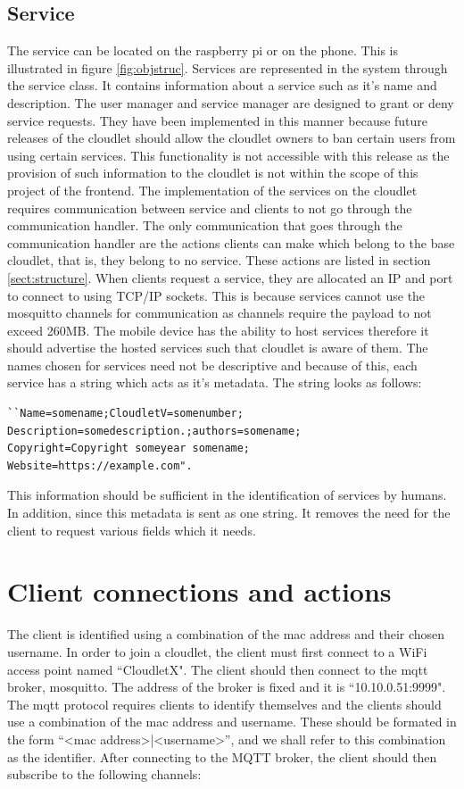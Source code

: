 \subsection{Service}
The service can be located on the raspberry pi or on the phone. This is illustrated in figure \ref{fig:objstruc}. Services are represented in the system through the service class. It contains information about a service such as it's name and description. The user manager and service manager are designed to grant or deny service requests. They have been implemented in this manner because future releases of the cloudlet should allow the cloudlet owners to ban certain users from using certain services. This functionality is not accessible with this release as the provision of such information to the cloudlet is not within the scope of this project of the frontend. The implementation of the services on the cloudlet requires communication between service and clients to not go through the communication handler. The only communication that goes through the communication handler are the actions clients can make which belong to the base cloudlet, that is, they belong to no service. These actions are listed in section \ref{sect:structure}. When clients request a service, they are allocated an IP and port to connect to using TCP/IP sockets. This is because services cannot use the mosquitto channels for communication as channels require the payload to not exceed 260MB. The mobile device has the ability to host services therefore it should advertise the hosted services such that cloudlet is aware of them. The names chosen for services need not be descriptive and because of this, each service has a string which acts as it's metadata. The string looks as follows:

\begin{lstlisting}
``Name=somename;CloudletV=somenumber;
Description=somedescription.;authors=somename;
Copyright=Copyright someyear somename;
Website=https://example.com".
\end{lstlisting}

\noindent This information should be sufficient in the identification of services by humans. In addition, since this metadata is sent as one string. It removes the need for the client to request various fields which it needs.

\section{Client connections and actions}
The client is identified using a combination of the mac address and their chosen username. In order to join a cloudlet, the client must first connect to a WiFi access point named ``CloudletX". The client should then connect to the mqtt broker, mosquitto. The address of the broker is fixed and it is ``10.10.0.51:9999". The mqtt protocol requires clients to identify themselves and the clients should use a combination of the mac address and username. These should be formated in the form “<mac address>|<username>”, and we shall refer to this combination as the identifier. After connecting to the MQTT broker, the client should then subscribe to the following channels:

